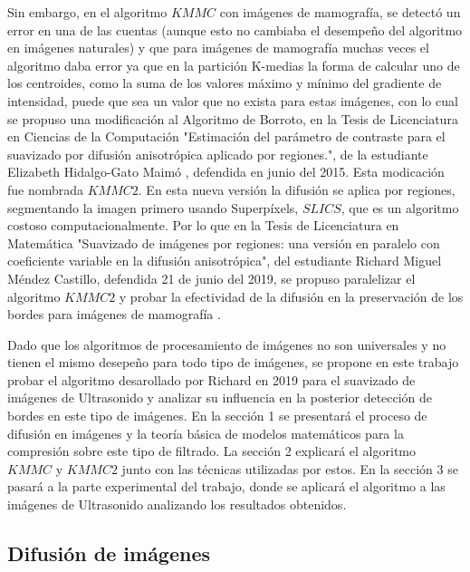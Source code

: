 \documentclass[a4paper,10pt,twocolumn]{article}
\begin{document}
Sin embargo, en el algoritmo $KMMC$ con im\'agenes de mamograf\'ia, se detect\'o un error en una de las cuentas (aunque esto no cambiaba el desempe\~no del algoritmo en im\'agenes naturales) y que para im\'agenes de mamograf\'ia muchas veces el algoritmo daba error ya que en la partici\'on K-medias la forma de calcular uno de los centroides, como la suma de los valores m\'aximo y m\'inimo del gradiente de intensidad, puede que sea un valor que no exista para estas im\'agenes, con lo cual se propuso una modificaci\'on al Algoritmo de Borroto, en la Tesis de Licenciatura en Ciencias de la Computaci\'on "Estimaci\'on del par\'ametro de contraste para el suavizado por difusi\'on anisotr\'opica aplicado por regiones.", de la estudiante Elizabeth Hidalgo-Gato Maim\'o \cite{hidalgo}, defendida en junio del 2015. Esta modicaci\'on fue nombrada $KMMC2$. En esta nueva versi\'on la difusi\'on se aplica por regiones, segmentando la imagen primero usando Superp\'ixels, $SLICS$, que es un algoritmo costoso computacionalmente. Por lo que en la Tesis de Licenciatura en Matem\'atica "Suavizado de im\'agenes por regiones: una versi\'on en paralelo con coeficiente variable en la difusi\'on anisotr\'opica", del estudiante Richard Miguel M\'endez Castillo, defendida 21 de junio del 2019, se propuso paralelizar el algoritmo $KMMC2$ y probar la efectividad de la difusi\'on en la preservaci\'on de los bordes para im\'agenes de mamograf\'ia \cite{richard}.

Dado que los algoritmos de procesamiento de im\'agenes no son universales y no tienen el mismo desepe\~no para todo tipo de im\'agenes, se propone en este trabajo probar el algoritmo desarollado por Richard en 2019 para el suavizado de im\'agenes de Ultrasonido y analizar su influencia en la posterior detecci\'on de bordes en este tipo de im\'agenes. En la secci\'on 1 se presentar\'a el proceso de difusi\'on en im\'agenes y la teor\'ia b\'asica de modelos matem\'aticos para la compresi\'on sobre este tipo de filtrado. La secci\'on 2 explicar\'a el algoritmo $KMMC$ y $KMMC2$ junto con las t\'ecnicas utilizadas por estos. En la secci\'on 3 se pasar\'a a la parte experimental del trabajo, donde se aplicar\'a el algoritmo a las im\'agenes de Ultrasonido analizando los resultados obtenidos.

\subsection{Difusi\'on de im\'agenes}\label{sec:difusion_imagenes}
\end{document}
